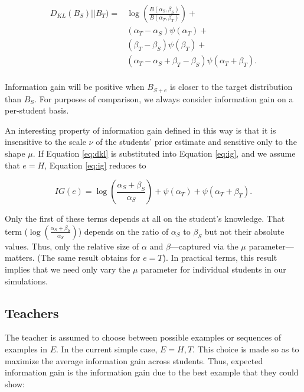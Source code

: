 \documentclass[10pt,letterpaper]{article}
\begin{document}
\begin{equation}
\label{eq:dkl}
\begin{split}
D_{KL} ( B_{S})||B_T )  = & \log( \frac{B(\alpha_{S},\beta_{S})}{B(\alpha_{T},\beta_{T})}) + \\
& (\alpha_T - \alpha_S) \psi (\alpha_T) + \\ 
& (\beta_T - \beta_S) \psi (\beta_T) + \\
& (\alpha_T - \alpha_S + \beta_T - \beta_S) \psi (\alpha_T + \beta_T). \\
\end{split}
\end{equation}

\noindent Information gain will be positive when $B_{S+e}$ is closer to the target distribution than $B_S$. For purposes of comparison, we always consider information gain on a per-student basis. 

An interesting property of information gain defined in this way is that it is insensitive to the scale $\nu$ of the students' prior estimate and sensitive only to the shape $\mu$. If Equation \ref{eq:dkl} is substituted into Equation \ref{eq:ig}, and we assume that $e=H$, Equation \ref{eq:ig} reduces to

\begin{equation}
IG(e) = \log(\frac{\alpha_S + \beta_S}{\alpha_S}) + \psi (\alpha_T) + \psi (\alpha_T + \beta_T).
\end{equation}

\noindent Only the first of these terms depends at all on the student's knowledge. That term ($\log(\frac{\alpha_S + \beta_S}{\alpha_S})$) depends on the ratio of $\alpha_S$ to $\beta_S$ but not their absolute values. Thus, only the relative size of $\alpha$ and $\beta$---captured via the $\mu$ parameter---matters. (The same result obtains for $e=T$). In practical terms, this result implies that we need only vary the $\mu$ parameter for individual students in our simulations.

\subsection{Teachers}

The teacher is assumed to choose between possible examples or sequences of examples in $E$. In the current simple case, $E={H,T}$. This choice is made so as to maximize the average information gain across students. Thus, expected information gain is the information gain due to the best example that they could show:
\end{document}
